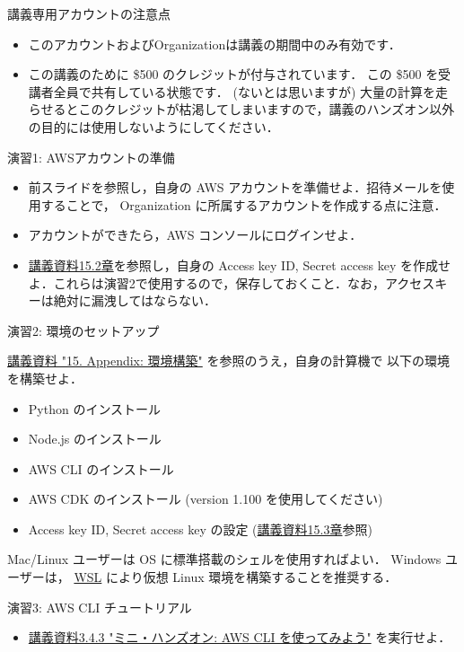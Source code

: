 \documentclass[unicode,11pt]{beamer}
\begin{document}
\begin{frame}{講義専用アカウントの注意点}

\begin{itemize}
    \item このアカウントおよびOrganizationは講義の期間中のみ有効です．
    \item この講義のために \$500 のクレジットが付与されています．
    この \$500 を受講者全員で共有している状態です．
    (ないとは思いますが) 大量の計算を走らせるとこのクレジットが枯渇してしまいますので，講義のハンズオン以外の目的には使用しないようにしてください．
\end{itemize}

\end{frame}

\begin{frame}{演習1: AWSアカウントの準備}
\begin{itemize}
    \item 前スライドを参照し，自身の AWS アカウントを準備せよ．招待メールを使用することで， Organization に所属するアカウントを作成する点に注意．
    \item アカウントができたら，AWS コンソールにログインせよ．
    \item \href{https://tomomano.github.io/learn-aws-by-coding/#aws_secrets}{講義資料15.2章}を参照し，自身の Access key ID, Secret access key を作成せよ．これらは演習2で使用するので，保存しておくこと．なお，アクセスキーは絶対に漏洩してはならない．
\end{itemize}
\end{frame}

\begin{frame}{演習2: 環境のセットアップ}

\href{https://tomomano.github.io/learn-aws-by-coding/#sec:appendix_settingup}{講義資料 "15. Appendix: 環境構築"} を参照のうえ，自身の計算機で
以下の環境を構築せよ．

\begin{itemize}
    \item Python のインストール
    \item Node.js のインストール
    \item AWS CLI のインストール
    \item AWS CDK のインストール (version 1.100 を使用してください)
    \item Access key ID, Secret access key の設定 (\href{https://tomomano.github.io/learn-aws-by-coding/#aws_secrets}{講義資料15.3章}参照)
\end{itemize}

Mac/Linux ユーザーは OS に標準搭載のシェルを使用すればよい．
Windows ユーザーは， \href{https://docs.microsoft.com/en-us/windows/wsl/install}{WSL} により仮想 Linux 環境を構築することを推奨する．

\end{frame}

\begin{frame}{演習3: AWS CLI チュートリアル}

\begin{itemize}
    \item \href{https://tomomano.github.io/learn-aws-by-coding/\#\_aws\%E3\%81\%A7\%E3\%81\%AE\%E3\%82\%AF\%E3\%83\%A9\%E3\%82\%A6\%E3\%83\%89\%E9\%96\%8B\%E7\%99\%BA}{講義資料3.4.3 "ミニ・ハンズオン: AWS CLI を使ってみよう"} を実行せよ．
\end{itemize}
    
\end{frame}
\end{document}
